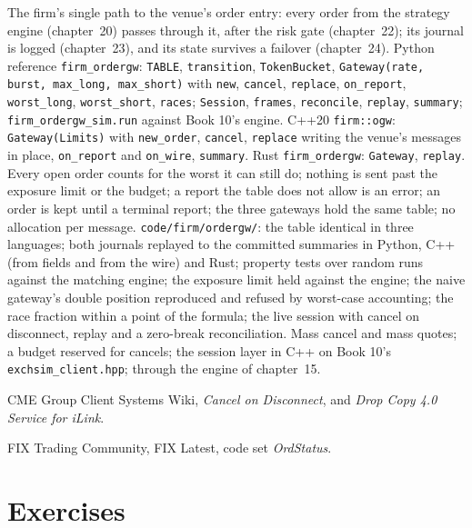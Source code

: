 \begin{build}
 The firm's single path to the venue's order entry: every order from the strategy engine (chapter~20) passes
through it, after the risk gate (chapter~22); its journal is logged (chapter~23), and its state survives a failover
(chapter~24).
 Python reference \texttt{firm\_ordergw}: \texttt{TABLE}, \texttt{transition}, \texttt{TokenBucket},
\texttt{Gateway(rate, burst, max\_long, max\_short)} with \texttt{new}, \texttt{cancel}, \texttt{replace}, \texttt{on\_report},
\texttt{worst\_long}, \texttt{worst\_short}, \texttt{races}; \texttt{Session}, \texttt{frames}, \texttt{reconcile},
\texttt{replay}, \texttt{summary}; \texttt{firm\_ordergw\_sim.run} against Book 10's engine. C++20 \texttt{firm::ogw}:
\texttt{Gateway(Limits)} with \texttt{new\_order}, \texttt{cancel}, \texttt{replace} writing the venue's messages in place,
\texttt{on\_report} and \texttt{on\_wire}, \texttt{summary}. Rust \texttt{firm\_ordergw}: \texttt{Gateway}, \texttt{replay}.
 Every open order counts for the worst it can still do; nothing is sent past the exposure limit or the budget;
a report the table does not allow is an error; an order is kept until a terminal report; the three gateways hold the same
table; no allocation per message.
 \texttt{code/firm/ordergw/}: the table identical in three languages; both journals replayed to the
committed summaries in Python, C++ (from fields and from the wire) and Rust; property tests over random runs against the
matching engine; the exposure limit held against the engine; the naive gateway's double position reproduced and refused by
worst-case accounting; the race fraction within a point of the formula; the live session with cancel on disconnect, replay
and a zero-break reconciliation.
 Mass cancel and mass quotes; a budget reserved for cancels; the session layer in C++ on Book 10's
\texttt{exchsim\_client.hpp};  through the engine of chapter~15.
\end{build}

\begin{omsources}
\item CME Group Client Systems Wiki, \emph{Cancel on Disconnect}, and \emph{Drop Copy 4.0 Service for iLink}.
\item FIX Trading Community, FIX Latest, code set \emph{OrdStatus}.
\end{omsources}

\section{Exercises}

